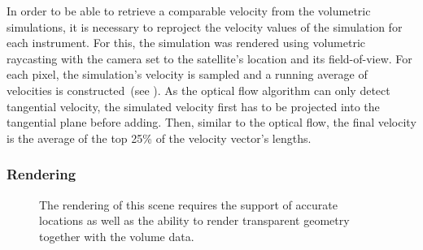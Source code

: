 In order to be able to retrieve a comparable velocity from the volumetric simulations, it is necessary to reproject the velocity values of the simulation for each instrument.  For this, the simulation was rendered using volumetric raycasting with the camera set to the satellite's location and its field-of-view.  For each pixel, the simulation's velocity is sampled and a running average of velocities is constructed~(see ).  As the optical flow algorithm can only detect tangential velocity, the simulated velocity first has to be projected into the tangential plane before adding.  Then, similar to the optical flow, the final velocity is the average of the top 25\% of the velocity vector's lengths.


\subsubsection{Rendering} \label{contributions:astro:spaceweather:rendering}
\begin{figure}
\centering
{}
\caption{The rendering of this scene requires the support of accurate locations as well as the ability to render transparent geometry together with the volume data.}
\label{contributions:astro:spaceweather:rendering:rendering}
\end{figure}

